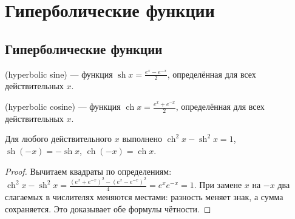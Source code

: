 \chapter{Гиперболические функции}\label{chap:c14-hyperbolic}
\section{Гиперболические функции}
\begin{definition} (hyperbolic sine) — функция \(\operatorname{sh} x=\frac{e^x-e^{-x}}2\), определённая для всех действительных \(x\).\end{definition}
\begin{definition} (hyperbolic cosine) — функция \(\operatorname{ch} x=\frac{e^x+e^{-x}}2\), определённая для всех действительных \(x\).\end{definition}
\begin{theorem}\label{thm:legacy-c14-3}
Для любого действительного \(x\) выполнено \(\operatorname{ch}^2x-\operatorname{sh}^2x=1\), \(\operatorname{sh}(-x)=-\operatorname{sh} x\), \(\operatorname{ch}(-x)=\operatorname{ch} x\).
\end{theorem}
\begin{proof}
Вычитаем квадраты по определениям: \(\operatorname{ch}^2x-\operatorname{sh}^2x=\frac{(e^x+e^{-x})^2-(e^x-e^{-x})^2}{4}=e^xe^{-x}=1\). При замене \(x\) на \(-x\) два слагаемых в числителях меняются местами: разность меняет знак, а сумма сохраняется. Это доказывает обе формулы чётности.
\end{proof}
